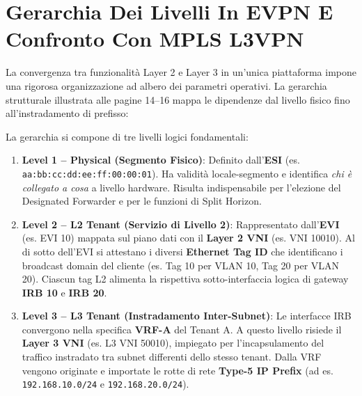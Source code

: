 \documentclass[11pt, a4paper]{article}
\begin{document}
\newpage


\section{Gerarchia Dei Livelli In EVPN E Confronto Con MPLS L3VPN}

La convergenza tra funzionalità Layer 2 e Layer 3 in un'unica piattaforma impone una rigorosa organizzazione ad albero dei parametri operativi. La gerarchia strutturale illustrata alle pagine 14--16 mappa le dipendenze dal livello fisico fino all'instradamento di prefisso:


La gerarchia si compone di tre livelli logici fondamentali:
\begin{enumerate}
    \item \textbf{Level 1 -- Physical (Segmento Fisico)}:
    Definito dall'\textbf{ESI} (es. \texttt{aa:bb:cc:dd:ee:ff:00:00:01}). Ha validità locale-segmento e identifica \emph{chi è collegato a cosa} a livello hardware. Risulta indispensabile per l'elezione del Designated Forwarder e per le funzioni di Split Horizon.
    \item \textbf{Level 2 -- L2 Tenant (Servizio di Livello 2)}:
    Rappresentato dall'\textbf{EVI} (es. EVI 10) mappata sul piano dati con il \textbf{Layer 2 VNI} (es. VNI 10010). Al di sotto dell'EVI si attestano i diversi \textbf{Ethernet Tag ID} che identificano i broadcast domain del cliente (es. Tag 10 per VLAN 10, Tag 20 per VLAN 20). Ciascun tag L2 alimenta la rispettiva sotto-interfaccia logica di gateway \textbf{IRB 10} e \textbf{IRB 20}.
    \item \textbf{Level 3 -- L3 Tenant (Instradamento Inter-Subnet)}:
    Le interfacce IRB convergono nella specifica \textbf{VRF-A} del Tenant A. A questo livello risiede il \textbf{Layer 3 VNI} (es. L3 VNI 50010), impiegato per l'incapsulamento del traffico instradato tra subnet differenti dello stesso tenant. Dalla VRF vengono originate e importate le rotte di rete \textbf{Type-5 IP Prefix} (ad es. \texttt{192.168.10.0/24} e \texttt{192.168.20.0/24}).
\end{enumerate}
\end{document}
